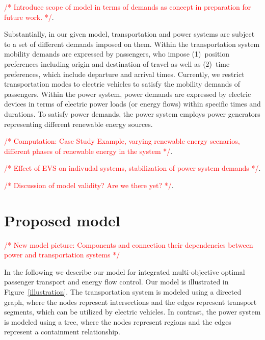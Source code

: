 \documentclass[conference]{IEEEtran}
\newcommand{\todo}[1]{\textcolor{red}{/* #1 */}}
\begin{document}
	\todo{Introduce scope of model in terms of demands as concept in preparation for future work.}.
	
	Substantially, in our given model, transportation and power systems are subject to a set of different demands imposed on them. 
	Within the transportation system mobility demands are expressed by passengers, who impose (1)~position preferences including origin and destination of travel as well as (2)~time preferences, which include departure and arrival times. Currently, we restrict transportation modes to electric vehicles to satisfy the mobility demands of passengers.
	Within the power system, power demands are expressed by electric devices in terms of electric power loads (or energy flows) within specific times and durations. To satisfy power demands, the power system employs power generators representing different renewable energy sources.
	
	\todo{Computation: Case Study Example, varying renewable energy scenarios, different phases of renewable energy in the system}.
	
	\todo{Effect of EVS on indivudal systems, stabilization of power system demands}.
		
	\todo{Discussion of model validity? Are we there yet?}.

	\section{Proposed model}
	\label{proposed_model}
	
	 \todo{New model picture: Components and connection their dependencies between power and transportation systems}
	 
	 
	In the following we describe our model for integrated multi-objective optimal passenger transport and energy flow control. Our model is illustrated in Figure~\ref{illustration}. The transportation system is modeled using a directed graph, where the nodes represent intersections and the edges represent transport segments, which can be utilized by electric vehicles. In contrast, the power system is modeled using a tree, where the nodes represent regions and the edges represent a containment relationship.
	
	
\end{document}

